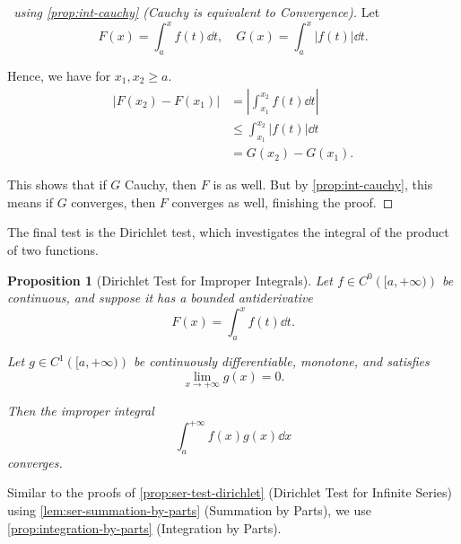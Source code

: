 \documentclass[11pt]{article}
\numberwithin{equation}{section}
\newtheorem{proposition}[theorem]{Proposition}
\theoremstyle{definition}
\theoremstyle{remark}
\newcommand{\pqty}[1]{\left(#1\right)}
\newcommand{\abs}[1]{\left|#1\right|}
\newcommand{\cointv}[2]{[#1,#2)}
\newcommand{\plusinfty}{+\infty}
\newcommand{\contClass}[1]{C^{#1}}
\begin{document}
\begin{proof}[\proofname\ using \autoref{prop:int-cauchy} (Cauchy is equivalent to Convergence)]
    Let
    \[
        F\pqty{x} = \int_{a}^{x} f\pqty{t} \dd{t}, \quad G\pqty{x} = \int_{a}^{x} \abs{f\pqty{t}} \dd{t}.
    \]

    Hence, we have for \(x_1, x_2 \geq a\).
    \begin{align*}
        \abs{F\pqty{x_2} - F\pqty{x_1}} &= \abs{\int_{x_1}^{x_2} f\pqty{t} \dd{t}} \\
        &\leq \int_{x_1}^{x_2} \abs{f\pqty{t}} \dd{t} \\
        &= G\pqty{x_2} - G\pqty{x_1}.
    \end{align*}

    This shows that if \(G\) Cauchy, then \(F\) is as well. But by \autoref{prop:int-cauchy}, this means if \(G\) converges, then \(F\) converges as well, finishing the proof.
\end{proof}

The final test is the Dirichlet test, which investigates the integral of the product of two functions.

\begin{proposition}[Dirichlet Test for Improper Integrals]\label{analysis-unit-0193}
    \label{prop:int-test-dirichlet}%
    Let \(f \in \contClass{0} \pqty{\cointv{a}{\plusinfty}}\) be continuous, and suppose it has a bounded antiderivative
    \[
        F\pqty{x} = \int_{a}^{x} f\pqty{t} \dd{t}.
    \]

    Let \(g \in \contClass{1} \pqty{\cointv{a}{\plusinfty}}\) be continuously differentiable, monotone, and satisfies
    \[
        \lim_{x \to \plusinfty} g\pqty{x} = 0.
    \]

    Then the improper integral
    \[
        \int_{a}^{\plusinfty} f\pqty{x} g\pqty{x} \dd{x}
    \]
    converges.
\end{proposition}

Similar to the proofs of \autoref{prop:ser-test-dirichlet} (Dirichlet Test for Infinite Series) using \autoref{lem:ser-summation-by-parts} (Summation by Parts), we use \autoref{prop:integration-by-parts} (Integration by Parts).
\end{document}
